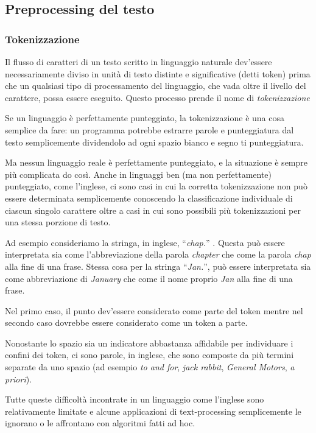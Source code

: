 \subsection{Preprocessing del testo}

\subsubsection{Tokenizzazione}

Il flusso di caratteri di un testo scritto in linguaggio naturale dev'essere
necessariamente diviso in unit\`a di testo distinte e significative (detti token)
prima che un qualsiasi tipo di processamento del linguaggio, che vada oltre il
livello del carattere, possa essere eseguito. Questo processo prende il nome di
\emph{tokenizzazione}

Se un linguaggio \`e perfettamente punteggiato, la tokenizzazione \`e una cosa
semplice da fare: un programma potrebbe estrarre parole e punteggiatura dal testo
semplicemente dividendolo ad ogni spazio bianco e segno ti punteggiatura.

Ma nessun linguaggio reale \`e perfettamente punteggiato, e la situazione \`e
sempre pi\`u complicata do cos\`i. Anche in linguaggi ben (ma non perfettamente)
punteggiato, come l'inglese, ci sono casi in cui la corretta tokenizzazione non
pu\`o essere determinata semplicemente conoscendo la classificazione individuale
di ciascun singolo carattere oltre a casi in cui sono possibili pi\`u tokenizzazioni
per una stessa porzione di testo.

Ad esempio consideriamo la stringa, in inglese, ``\emph{chap.}'' . Questa pu\`o
essere interpretata sia come l'abbreviazione della parola \emph{chapter} che come
la parola \emph{chap} alla fine di una frase. Stessa cosa per la stringa ``\emph{Jan.}'',
pu\`o essere interpretata sia come abbreviazione di \emph{January} che come il
nome proprio \emph{Jan} alla fine di una frase.

Nel primo caso, il punto dev'essere considerato come parte del token mentre nel
secondo caso dovrebbe essere considerato come un token a parte.

Nonostante lo spazio sia un indicatore abbastanza affidabile per individuare i
confini dei token, ci sono parole, in inglese, che sono composte da pi\`u termini
separate da uno spazio (ad esempio \emph{to and for}, \emph{jack rabbit},
\emph{General Motors}, \emph{a priori}).

Tutte queste difficolt\`a incontrate in un linguaggio come l'inglese sono
relativamente limitate e alcune applicazioni di text-processing semplicemente le
ignorano o le affrontano con algoritmi fatti ad hoc.

